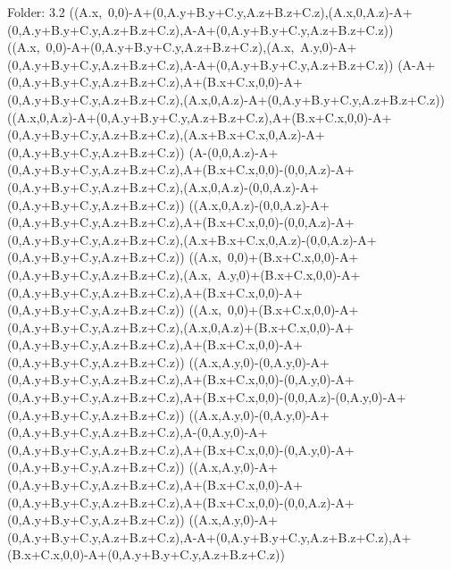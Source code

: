 Folder: 3.2
\left(\left(A.x,\ 0,0\right)-A+\left(0,A.y+B.y+C.y,A.z+B.z+C.z\right),\left(A.x,0,A.z\right)-A+\left(0,A.y+B.y+C.y,A.z+B.z+C.z\right),A-A+\left(0,A.y+B.y+C.y,A.z+B.z+C.z\right)\right)
\left(\left(A.x,\ 0,0\right)-A+\left(0,A.y+B.y+C.y,A.z+B.z+C.z\right),\left(A.x,\ A.y,0\right)-A+\left(0,A.y+B.y+C.y,A.z+B.z+C.z\right),A-A+\left(0,A.y+B.y+C.y,A.z+B.z+C.z\right)\right)
\left(A-A+\left(0,A.y+B.y+C.y,A.z+B.z+C.z\right),A+\left(B.x+C.x,0,0\right)-A+\left(0,A.y+B.y+C.y,A.z+B.z+C.z\right),\left(A.x,0,A.z\right)-A+\left(0,A.y+B.y+C.y,A.z+B.z+C.z\right)\right)
\left(\left(A.x,0,A.z\right)-A+\left(0,A.y+B.y+C.y,A.z+B.z+C.z\right),A+\left(B.x+C.x,0,0\right)-A+\left(0,A.y+B.y+C.y,A.z+B.z+C.z\right),\left(A.x+B.x+C.x,0,A.z\right)-A+\left(0,A.y+B.y+C.y,A.z+B.z+C.z\right)\right)
\left(A-\left(0,0,A.z\right)-A+\left(0,A.y+B.y+C.y,A.z+B.z+C.z\right),A+\left(B.x+C.x,0,0\right)-\left(0,0,A.z\right)-A+\left(0,A.y+B.y+C.y,A.z+B.z+C.z\right),\left(A.x,0,A.z\right)-\left(0,0,A.z\right)-A+\left(0,A.y+B.y+C.y,A.z+B.z+C.z\right)\right)
\left(\left(A.x,0,A.z\right)-\left(0,0,A.z\right)-A+\left(0,A.y+B.y+C.y,A.z+B.z+C.z\right),A+\left(B.x+C.x,0,0\right)-\left(0,0,A.z\right)-A+\left(0,A.y+B.y+C.y,A.z+B.z+C.z\right),\left(A.x+B.x+C.x,0,A.z\right)-\left(0,0,A.z\right)-A+\left(0,A.y+B.y+C.y,A.z+B.z+C.z\right)\right)
\left(\left(A.x,\ 0,0\right)+\left(B.x+C.x,0,0\right)-A+\left(0,A.y+B.y+C.y,A.z+B.z+C.z\right),\left(A.x,\ A.y,0\right)+\left(B.x+C.x,0,0\right)-A+\left(0,A.y+B.y+C.y,A.z+B.z+C.z\right),A+\left(B.x+C.x,0,0\right)-A+\left(0,A.y+B.y+C.y,A.z+B.z+C.z\right)\right)
\left(\left(A.x,\ 0,0\right)+\left(B.x+C.x,0,0\right)-A+\left(0,A.y+B.y+C.y,A.z+B.z+C.z\right),\left(A.x,0,A.z\right)+\left(B.x+C.x,0,0\right)-A+\left(0,A.y+B.y+C.y,A.z+B.z+C.z\right),A+\left(B.x+C.x,0,0\right)-A+\left(0,A.y+B.y+C.y,A.z+B.z+C.z\right)\right)
\left(\left(A.x,A.y,0\right)-\left(0,A.y,0\right)-A+\left(0,A.y+B.y+C.y,A.z+B.z+C.z\right),A+\left(B.x+C.x,0,0\right)-\left(0,A.y,0\right)-A+\left(0,A.y+B.y+C.y,A.z+B.z+C.z\right),A+\left(B.x+C.x,0,0\right)-\left(0,0,A.z\right)-\left(0,A.y,0\right)-A+\left(0,A.y+B.y+C.y,A.z+B.z+C.z\right)\right)
\left(\left(A.x,A.y,0\right)-\left(0,A.y,0\right)-A+\left(0,A.y+B.y+C.y,A.z+B.z+C.z\right),A-\left(0,A.y,0\right)-A+\left(0,A.y+B.y+C.y,A.z+B.z+C.z\right),A+\left(B.x+C.x,0,0\right)-\left(0,A.y,0\right)-A+\left(0,A.y+B.y+C.y,A.z+B.z+C.z\right)\right)
\left(\left(A.x,A.y,0\right)-A+\left(0,A.y+B.y+C.y,A.z+B.z+C.z\right),A+\left(B.x+C.x,0,0\right)-A+\left(0,A.y+B.y+C.y,A.z+B.z+C.z\right),A+\left(B.x+C.x,0,0\right)-\left(0,0,A.z\right)-A+\left(0,A.y+B.y+C.y,A.z+B.z+C.z\right)\right)
\left(\left(A.x,A.y,0\right)-A+\left(0,A.y+B.y+C.y,A.z+B.z+C.z\right),A-A+\left(0,A.y+B.y+C.y,A.z+B.z+C.z\right),A+\left(B.x+C.x,0,0\right)-A+\left(0,A.y+B.y+C.y,A.z+B.z+C.z\right)\right)

